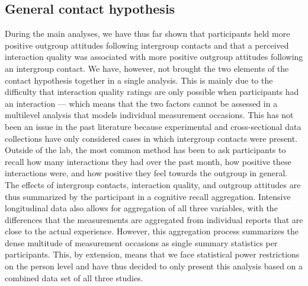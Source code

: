 \subsection{General contact hypothesis}

During the main analyses, we have thus far shown that participants held
more positive outgroup attitudes following intergroup contacts and that
a perceived interaction quality was associated with more positive
outgroup attitudes following an intergroup contact. We have, however,
not brought the two elements of the contact hypothesis together in a
single analysis. This is mainly due to the difficulty that interaction
quality ratings are only possible when participants had an interaction
--- which means that the two factors cannot be assessed in a multilevel
analysis that models individual measurement occasions. This has not been
an issue in the past literature because experimental and cross-sectional
data collections have only considered cases in which intergroup contacts
were present. Outside of the lab, the most common method has been to ask
participants to recall how many interactions they had over the past
month, how positive these interactions were, and how positive they feel
towards the outgroup in general. The effects of intergroup contacts,
interaction quality, and outgroup attitudes are thus summarized by the
participant in a cognitive recall aggregation. Intensive longitudinal
data also allows for aggregation of all three variables, with the
differences that the measurements are aggregated from individual reports
that are close to the actual experience. However, this aggregation
process summarizes the dense multitude of measurement occasions as
single summary statistics per participants. This, by extension, means
that we face statistical power restrictions on the person level and have
thus decided to only present this analysis based on a combined data set
of all three studies.

